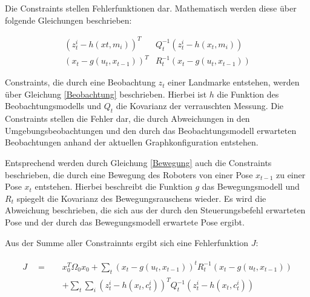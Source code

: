 
Die Constraints stellen Fehlerfunktionen dar. Mathematisch werden diese über folgende Gleichungen beschrieben:

\begin{subequations}
\label{Constraints}
	\begin{align}
		(z_t^i-h(xt,m_i))^T &Q_t^{-1} (z_t^i-h(x_t,m_i)) 
		\label{Beobachtung}\\
		(x_t-g(u_t,x_{t-1}))^T &R_t^{-1}  (x_t-g(u_t,x_{t-1}))
		\label{Bewegung}
	\end{align}
\end{subequations}

Constraints, die durch eine Beobachtung $ z_t $ einer Landmarke entstehen, werden über Gleichung \ref{Beobachtung} beschrieben. Hierbei ist $ h $ die Funktion des Beobachtungsmodells und $ Q_t $ die Kovarianz der verrauschten Messung. Die Constraints stellen die Fehler dar, die durch Abweichungen in den Umgebungsbeobachtungen und den durch das Beobachtungsmodell erwarteten Beobachtungen anhand der aktuellen Graphkonfiguration entstehen. 

Entsprechend werden durch Gleichung \ref{Bewegung} auch die Constraints beschrieben, die durch eine Bewegung des Roboters von einer Pose $ x_{t-1} $ zu einer Pose $ x_t $ entstehen. Hierbei beschreibt die Funktion $ g $ das Bewegungsmodell und $ R_t $ spiegelt die Kovarianz des Bewegungsrauschens wieder. Es wird die Abweichung beschrieben, die sich aus der durch den Steuerungsbefehl erwarteten Pose und der durch das Bewegungsmodell erwartete Pose ergibt. 

Aus der Summe aller Constrainnts ergibt sich eine Fehlerfunktion $ J $: 

\begin{align}
	\begin{split}
	J \quad = \quad &x_0^T\Omega_0x_0 + \sum_t(x_t-g(u_t,x_{t-1}))^t R_t^{-1} (x_t-g(u_t,x_{t-1})) \\ 
	&+ \sum_t \sum_i(z_t^i-h(x_t,c_t^i))^T Q_t^{-1} (z_t^i-h(x_t,c_t^i))
	\end{split}
\end{align}

